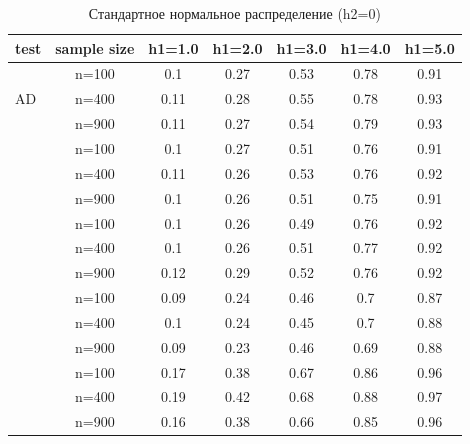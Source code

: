 \documentclass[12pt]{article}
\theoremstyle{break}
\begin{document}
\begin{table}[!h]
	\centering
	\caption{Стандартное нормальное распределение (h2=0)}
	\begin{tabular}{l c c c c c c} 
		\toprule
		test & sample size & h1=1.0 & h1=2.0 & h1=3.0 & h1=4.0 & h1=5.0 \\ 
		\midrule
		\multirow{3}{*}{AD} 
		& n=100 & 0.1 & 0.27 & 0.53 & 0.78 & 0.91 \\ 
		& n=400 & 0.11 & 0.28 & 0.55 & 0.78 & 0.93 \\ 
		& n=900 & 0.11 & 0.27 & 0.54 & 0.79 & 0.93 \\ 
		\addlinespace
		\addlinespace
		\multirow{3}{*}{CM} 
		& n=100 & 0.1 & 0.27 & 0.51 & 0.76 & 0.91 \\ 
		& n=400 & 0.11 & 0.26 & 0.53 & 0.76 & 0.92 \\ 
		& n=900 & 0.1 & 0.26 & 0.51 & 0.75 & 0.91 \\ 
		\addlinespace
		\addlinespace
		\multirow{3}{*}{ET} 
		& n=100 & 0.1 & 0.26 & 0.49 & 0.76 & 0.92 \\ 
		& n=400 & 0.1 & 0.26 & 0.51 & 0.77 & 0.92 \\ 
		& n=900 & 0.12 & 0.29 & 0.52 & 0.76 & 0.92 \\ 
		\addlinespace
		\addlinespace
		\multirow{3}{*}{KS} 
		& n=100 & 0.09 & 0.24 & 0.46 & 0.7 & 0.87 \\ 
		& n=400 & 0.1 & 0.24 & 0.45 & 0.7 & 0.88 \\ 
		& n=900 & 0.09 & 0.23 & 0.46 & 0.69 & 0.88 \\ 
		\addlinespace
		\addlinespace
		\multirow{3}{*}{WMW} 
		& n=100 & 0.17 & 0.38 & 0.67 & 0.86 & 0.96 \\ 
		& n=400 & 0.19 & 0.42 & 0.68 & 0.88 & 0.97 \\ 
		& n=900 & 0.16 & 0.38 & 0.66 & 0.85 & 0.96 \\ 
		\bottomrule
	\end{tabular}
	\label{tbl:normal_pow_vs_h1}
\end{table}
\end{document}

